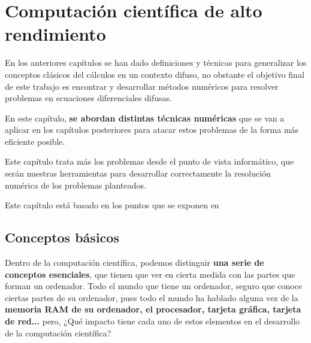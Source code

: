 
\chapter{Computación científica de alto rendimiento}
En los anteriores capítulos se han dado definiciones y técnicas para generalizar los conceptos clásicos del cálculos en un contexto difuso, no obstante el objetivo final de este trabajo es encontrar y desarrollar métodos numéricos para resolver problemas en ecuaciones diferenciales difusas.

En este capítulo, \textbf{se abordan distintas técnicas numéricas} que se van a aplicar en los capítulos posteriores para atacar estos problemas de la forma más eficiente posible. 

Este capítulo trata más los problemas desde el punto de vista informático, que serán nuestras herramientas para desarrollar correctamente la resolución numérica de los problemas planteados.

Este capítulo está basado en los puntos que se exponen en \cite{paralelo}

\section{Conceptos básicos}
Dentro de la computación científica, podemos distinguir \textbf{una serie de conceptos esenciales}, que tienen que ver en cierta medida con las partes que forman un ordenador. Todo el mundo que tiene un ordenador, seguro que conoce ciertas partes de su ordenador, pues todo el mundo ha hablado alguna vez de la \textbf{memoria RAM de su ordenador, el procesador, tarjeta gráfica, tarjeta de red...} pero, ¿Qué impacto tiene cada uno de estos elementos en el desarrollo de la computación científica?

